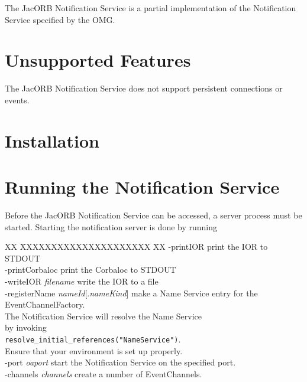 %

The JacORB Notification Service is a partial implementation of
the Notification Service specified by the OMG.

\section{Unsupported Features}

The JacORB Notification Service does not support persistent connections or events.

\section{Installation}
\label{sec:installation}

\section{Running the Notification Service}
\label{sec:ntfy-running}

Before the JacORB Notification Service can be accessed, a server
process must be started. Starting
the notification server is done by running


\begin{tabbing}
XX \= XXXXXXXXXXXXXXXXXXXXX \= XX \kill
\> -printIOR \> print the IOR to STDOUT \\
\> -printCorbaloc \> print the Corbaloc to STDOUT \\
\> -writeIOR \emph{filename} \> write the IOR to a file \\
\> -registerName \emph{nameId}[.\emph{nameKind}] \> make a Name Service entry
for the EventChannelFactory. \\
\> \> The Notification Service will resolve the Name Service \\
\> \> by invoking \\
\> \> \texttt{resolve\_initial\_references("NameService")}. \\
\> \> Ensure that your environment is set up properly. \\
\> -port \emph{oaport} \> start the Notification Service on the specified
port. \\
\> -channels \emph{channels} \> create a number of EventChannels. \\
\end{tabbing}

